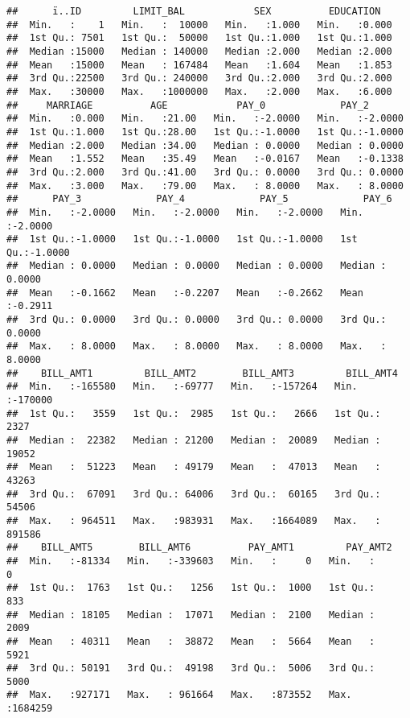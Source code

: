 \documentclass[]{article}
\begin{document}
\begin{verbatim}
##      ï..ID         LIMIT_BAL            SEX          EDUCATION    
##  Min.   :    1   Min.   :  10000   Min.   :1.000   Min.   :0.000  
##  1st Qu.: 7501   1st Qu.:  50000   1st Qu.:1.000   1st Qu.:1.000  
##  Median :15000   Median : 140000   Median :2.000   Median :2.000  
##  Mean   :15000   Mean   : 167484   Mean   :1.604   Mean   :1.853  
##  3rd Qu.:22500   3rd Qu.: 240000   3rd Qu.:2.000   3rd Qu.:2.000  
##  Max.   :30000   Max.   :1000000   Max.   :2.000   Max.   :6.000  
##     MARRIAGE          AGE            PAY_0             PAY_2        
##  Min.   :0.000   Min.   :21.00   Min.   :-2.0000   Min.   :-2.0000  
##  1st Qu.:1.000   1st Qu.:28.00   1st Qu.:-1.0000   1st Qu.:-1.0000  
##  Median :2.000   Median :34.00   Median : 0.0000   Median : 0.0000  
##  Mean   :1.552   Mean   :35.49   Mean   :-0.0167   Mean   :-0.1338  
##  3rd Qu.:2.000   3rd Qu.:41.00   3rd Qu.: 0.0000   3rd Qu.: 0.0000  
##  Max.   :3.000   Max.   :79.00   Max.   : 8.0000   Max.   : 8.0000  
##      PAY_3             PAY_4             PAY_5             PAY_6        
##  Min.   :-2.0000   Min.   :-2.0000   Min.   :-2.0000   Min.   :-2.0000  
##  1st Qu.:-1.0000   1st Qu.:-1.0000   1st Qu.:-1.0000   1st Qu.:-1.0000  
##  Median : 0.0000   Median : 0.0000   Median : 0.0000   Median : 0.0000  
##  Mean   :-0.1662   Mean   :-0.2207   Mean   :-0.2662   Mean   :-0.2911  
##  3rd Qu.: 0.0000   3rd Qu.: 0.0000   3rd Qu.: 0.0000   3rd Qu.: 0.0000  
##  Max.   : 8.0000   Max.   : 8.0000   Max.   : 8.0000   Max.   : 8.0000  
##    BILL_AMT1         BILL_AMT2        BILL_AMT3         BILL_AMT4      
##  Min.   :-165580   Min.   :-69777   Min.   :-157264   Min.   :-170000  
##  1st Qu.:   3559   1st Qu.:  2985   1st Qu.:   2666   1st Qu.:   2327  
##  Median :  22382   Median : 21200   Median :  20089   Median :  19052  
##  Mean   :  51223   Mean   : 49179   Mean   :  47013   Mean   :  43263  
##  3rd Qu.:  67091   3rd Qu.: 64006   3rd Qu.:  60165   3rd Qu.:  54506  
##  Max.   : 964511   Max.   :983931   Max.   :1664089   Max.   : 891586  
##    BILL_AMT5        BILL_AMT6          PAY_AMT1         PAY_AMT2      
##  Min.   :-81334   Min.   :-339603   Min.   :     0   Min.   :      0  
##  1st Qu.:  1763   1st Qu.:   1256   1st Qu.:  1000   1st Qu.:    833  
##  Median : 18105   Median :  17071   Median :  2100   Median :   2009  
##  Mean   : 40311   Mean   :  38872   Mean   :  5664   Mean   :   5921  
##  3rd Qu.: 50191   3rd Qu.:  49198   3rd Qu.:  5006   3rd Qu.:   5000  
##  Max.   :927171   Max.   : 961664   Max.   :873552   Max.   :1684259  

\end{verbatim}
\end{document}
